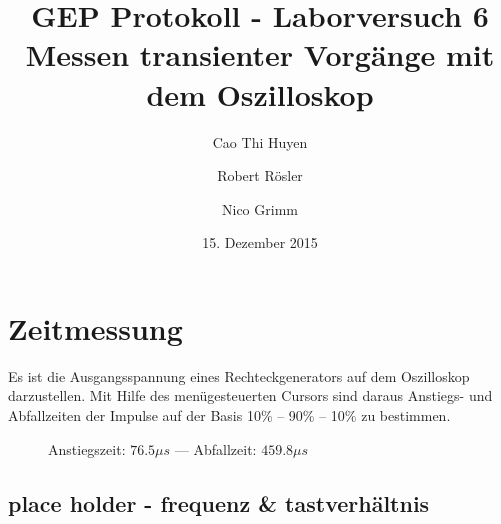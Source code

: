 \documentclass[11pt,a4paper,titlepage]{article}
\begin{document}
\title{GEP Protokoll - Laborversuch 6\\[1ex]
Messen transienter Vorg\"ange mit dem Oszilloskop}
\author{Cao Thi Huyen \and Robert R\"osler \and Nico Grimm}
\date{15. Dezember 2015}

\maketitle

\section{Zeitmessung}
Es ist die Ausgangsspannung eines Rechteckgenerators auf dem Oszilloskop darzustellen. Mit Hilfe des men\"ugesteuerten Cursors sind daraus Anstiegs- und Abfallzeiten der Impulse auf der Basis 10\% -- 90\% -- 10\% zu bestimmen.

\begin{figure}[h!]
  \caption{Anstiegszeit: $76.5\mu s$ --- Abfallzeit: $459.8\mu{}s$}
\end{figure}

\subsection{place holder - frequenz \& tastverh\"altnis}
\end{document}
